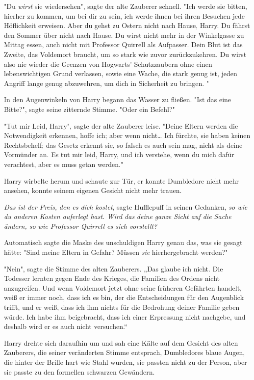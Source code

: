 {"Du \emph{wirst} sie wiedersehen", sagte der alte Zauberer schnell. "Ich werde sie bitten, hierher zu kommen, um bei dir zu sein, ich werde ihnen bei ihren Besuchen jede Höflichkeit erweisen. Aber du gehst zu Ostern nicht nach Hause, Harry. Du fährst den Sommer über nicht nach Hause. Du wirst nicht mehr in der Winkelgasse zu Mittag essen, auch nicht mit Professor Quirrell als Aufpasser. Dein Blut ist das Zweite, das Voldemort braucht, um so stark wie zuvor zurückzukehren. Du wirst also nie wieder die Grenzen von Hogwarts' Schutzzaubern ohne einen lebenswichtigen Grund verlassen, sowie eine Wache, die stark genug ist, jeden Angriff lange genug abzuwehren, um dich in Sicherheit zu bringen. "

In den Augenwinkeln von Harry begann das Wasser zu fließen. "Ist das eine Bitte?", sagte seine zitternde Stimme. "Oder ein Befehl?"

"Tut mir Leid, Harry", sagte der alte Zauberer leise. "Deine Eltern werden die Notwendigkeit erkennen, hoffe ich; aber wenn nicht… Ich fürchte, sie haben keinen Rechtsbehelf; das Gesetz erkennt sie, so falsch es auch sein mag, nicht als deine Vormünder an. Es tut mir leid, Harry, und ich verstehe, wenn du mich dafür verachtest, aber es muss getan werden."

Harry wirbelte herum und schaute zur Tür, er konnte Dumbledore nicht mehr ansehen, konnte seinem eigenen Gesicht nicht mehr trauen.

\emph{Das ist der Preis,} \emph{den es dich kostet}, sagte Hufflepuff in seinen Gedanken, \emph{so wie} \emph{du anderen Kosten auferlegt hast. Wird das} \emph{deine} \emph{ganze Sicht auf die Sache ändern, so wie Professor Quirrell es sich vorstellt?}

Automatisch sagte die Maske des unschuldigen Harry genau das, was sie gesagt hätte: "Sind meine Eltern in Gefahr? Müssen \emph{sie} hierhergebracht werden?"

"Nein", sagte die Stimme des alten Zauberers. „Das glaube ich nicht. Die Todesser lernten gegen Ende des Krieges, die Familien des Ordens nicht anzugreifen. Und wenn Voldemort jetzt ohne seine früheren Gefährten handelt, weiß er immer noch, dass ich es bin, der die Entscheidungen für den Augenblick trifft, und er weiß, dass ich ihm nichts für die Bedrohung deiner Familie geben würde. Ich habe ihm beigebracht, dass ich einer Erpressung nicht nachgebe, und deshalb wird er es auch nicht versuchen.“

Harry drehte sich daraufhin um und sah eine Kälte auf dem Gesicht des alten Zauberers, die seiner veränderten Stimme entsprach, Dumbledores blaue Augen, die hinter der Brille hart wie Stahl wurden, sie passten nicht zu der Person, aber sie passte zu den formellen schwarzen Gewändern.

}
